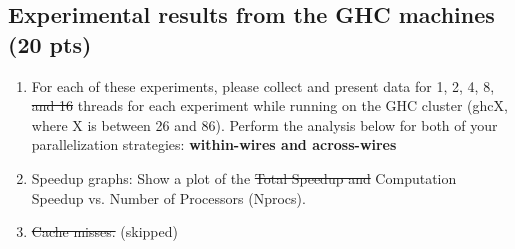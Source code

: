 \documentclass[letterpaper,11pt]{exam}
\begin{document}
\begin{questions}
\begin{figure}[h]
\begin{minipage}{0.4\textwidth}
            \label{fig:question1b}
            \vspace{-0.5cm}
        \end{minipage}
    \end{figure}

    \question
    \subsection*{Experimental results from the GHC machines (20 pts)}
    \begin{enumerate}[label=\roman*.]
        \item For each of these experiments, please
              collect and present data for 1, 2, 4, 8, \sout{and 16} threads for each experiment while running on the
              GHC cluster (ghcX, where X is between 26 and 86). Perform the analysis below for both of your
              parallelization strategies: \textbf{within-wires and across-wires}
        \item Speedup graphs: Show a plot of the \sout{Total Speedup and} Computation Speedup vs. Number of
              Processors (Nprocs). %
        \item \sout{Cache misses.} (skipped)


\end{enumerate}
\end{questions}
\end{document}
